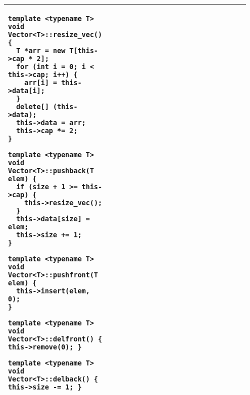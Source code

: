 \documentclass[main.tex,fontsize=8pt,paper=a4,paper=portrait,DIV=calc,]{scrartcl}
\begin{document}
\begin{table}[ht!]
\begin{tabular}{|m{0.2\linewidth}|m{0.755\linewidth}|}
\begin{lstlisting}
template <typename T> void Vector<T>::resize_vec() {
  T *arr = new T[this->cap * 2];
  for (int i = 0; i < this->cap; i++) {
    arr[i] = this->data[i];
  }
  delete[] (this->data);
  this->data = arr;
  this->cap *= 2;
}

template <typename T> void Vector<T>::pushback(T elem) {
  if (size + 1 >= this->cap) {
    this->resize_vec();
  }
  this->data[size] = elem;
  this->size += 1;
}

template <typename T> void Vector<T>::pushfront(T elem) {
  this->insert(elem, 0);
}

template <typename T> void Vector<T>::delfront() { this->remove(0); }

template <typename T> void Vector<T>::delback() { this->size -= 1; }
\end{lstlisting}
\\
\hline
\end{tabular}
\end{table}
\pagebreak
\end{document}
